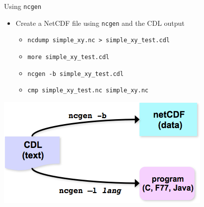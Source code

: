 \documentclass[compress,11pt,xcolor=svgnames,aspectratio=169]{beamer}
\begin{document}
\begin{frame}[fragile]{Using \texttt{ncgen}}

\begin{itemize}

  \item Create a NetCDF file using \texttt{ncgen} and the CDL output\\[0.2cm]

    \begin{itemize}
    \setlength\itemsep{0.2cm}

      \item \verb|ncdump simple_xy.nc > simple_xy_test.cdl|
      \item \verb|more simple_xy_test.cdl|
      \item \verb|ncgen -b simple_xy_test.cdl|
      \item \verb|cmp simple_xy_test.nc simple_xy.nc|

    \end{itemize}

\end{itemize}

\begin{center}
\includegraphics[scale=0.4]{fig/c-ncgen}
\end{center}

\end{frame}
\end{document}
